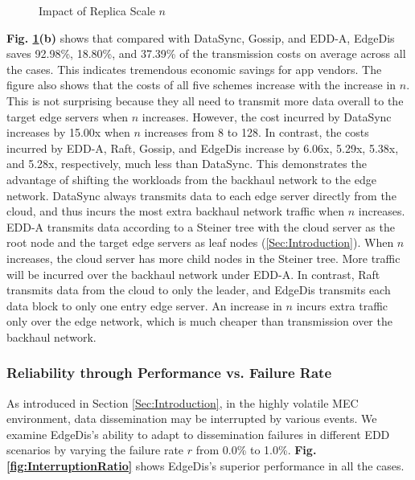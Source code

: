 \documentclass[10pt,journal,compsoc]{IEEEtran}
\begin{document}
\begin{figure}
    \centering
    \vspace{-1em}
    \caption{Impact of Replica Scale $n$}
    \vspace{-0.5em}
    \label{fig:EdgeServerScale}
\end{figure}

\textbf{Fig. \ref{fig:EdgeServerScale}(b)} shows that compared with DataSync, Gossip, and EDD-A, EdgeDis saves 92.98\%, 18.80\%, and 37.39\% of the transmission costs on average across all the cases. This indicates tremendous economic savings for app vendors. The figure also shows that the costs of all five schemes increase with the increase in $n$. This is not surprising because they all need to transmit more data overall to the target edge servers when $n$ increases. However, the cost incurred by DataSync increases by 15.00x when $n$ increases from 8 to 128. In contrast, the costs incurred by EDD-A, Raft, Gossip, and EdgeDis increase by 6.06x, 5.29x, 5.38x, and 5.28x, respectively, much less than DataSync. This demonstrates the advantage of shifting the workloads from the backhaul network to the edge network. DataSync always transmits data to each edge server directly from the cloud, and thus incurs the most extra backhaul network traffic when $n$ increases. EDD-A transmits data according to a Steiner tree with the cloud server as the root node and the target edge servers as leaf nodes (\cref{Sec:Introduction}). When $n$ increases, the cloud server has more child nodes in the Steiner tree. More traffic will be incurred over the backhaul network under EDD-A. In contrast, Raft transmits data from the cloud to only the leader, and EdgeDis transmits each data block to only one entry edge server. An increase in $n$ incurs extra traffic only over the edge network, which is much cheaper than transmission over the backhaul network.


%
\subsubsection{Reliability through Performance vs. Failure Rate} 

As introduced in Section \ref{Sec:Introduction}, in the highly volatile MEC environment, data dissemination may be interrupted by various events. 
We examine EdgeDis's ability to adapt to dissemination failures in different EDD scenarios by varying the failure rate $r$ from 0.0\% to 1.0\%. \textbf{Fig. \ref{fig:InterruptionRatio}} shows EdgeDis's superior performance in all the cases.
\end{document}
